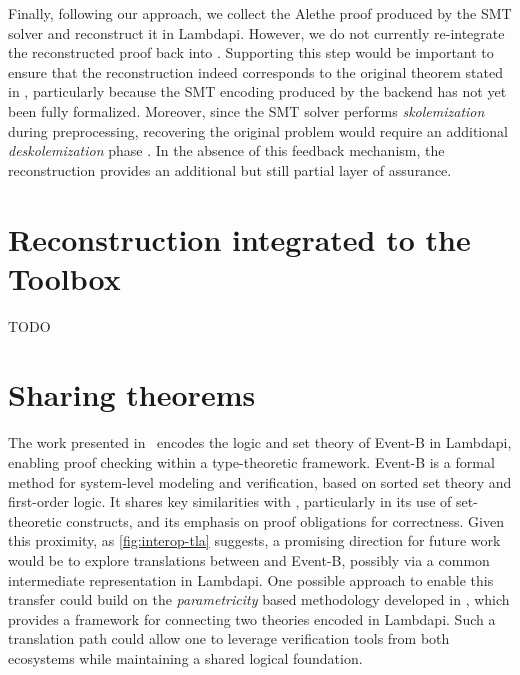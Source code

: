\smallskip

Finally, following our approach, we collect the Alethe proof produced by the SMT solver and reconstruct it in Lambdapi.
However, we do not currently re-integrate the reconstructed proof back into \tlaplus.
Supporting this step would be important to ensure that the reconstruction indeed corresponds to the original theorem stated in \tlaplus, particularly because the SMT encoding produced by the backend has not yet been fully formalized.
Moreover, since the SMT solver performs \emph{skolemization} during preprocessing, recovering the original problem would require an additional \emph{deskolemization} phase \cite{desko}.
In the absence of this feedback mechanism, the reconstruction provides an additional but still partial layer of assurance.


\section{Reconstruction integrated to the Toolbox}
\label{sec:tlaps-toolbox}

TODO

\section{Sharing \tlaplus theorems}
\label{sec:sharing-tlaps-theo}

The work presented in~\cite{eventb2lp} encodes the logic and set theory of Event-B in Lambdapi, enabling proof checking within a type-theoretic framework.
Event-B is a formal method for system-level modeling and verification, based on sorted set theory and first-order logic.
It shares key similarities with \tlaplus, particularly in its use of set-theoretic constructs, and its emphasis on proof obligations for correctness.
Given this proximity, as \cref{fig:interop-tla} suggests, a promising direction for future work would be to explore translations between \tlaplus and Event-B, possibly via a common intermediate representation in Lambdapi.
One possible approach to enable this transfer could build on the \emph{parametricity} \cite{theorem-for-free,parametricity} based methodology developed in \cite{parametricity-lp}, which provides a framework for connecting two theories encoded in Lambdapi. 
Such a translation path could allow one to leverage verification tools from both ecosystems while maintaining a shared logical foundation.